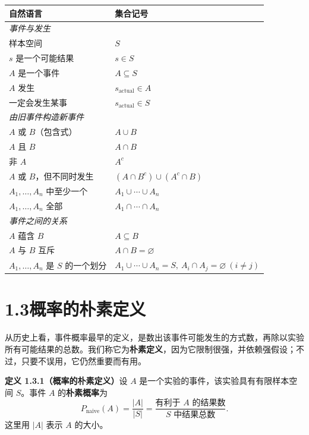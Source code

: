 \documentclass[UTF8, 12pt, fontset=fandol, oneside]{ctexart}
\begin{document}
\begin{center}
\begin{tabular}{ll}
\hline
\textbf{自然语言} & \textbf{集合记号} \\
\hline
\multicolumn{2}{l}{\textit{事件与发生}}\\
样本空间 & $S$\\
$s$ 是一个可能结果 & $s\in S$\\
$A$ 是一个事件 & $A\subseteq S$\\
$A$ 发生 & $s_{\text{actual}}\in A$\\
一定会发生某事 & $s_{\text{actual}}\in S$\\
\hline
\multicolumn{2}{l}{\textit{由旧事件构造新事件}}\\
$A$ 或 $B$（包含式） & $A\cup B$\\
$A$ 且 $B$ & $A\cap B$\\
非 $A$ & $A^c$\\
$A$ 或 $B$，但不同时发生 & $(A\cap B^c)\cup(A^c\cap B)$\\
$A_1,\ldots,A_n$ 中至少一个 & $A_1\cup\cdots\cup A_n$\\
$A_1,\ldots,A_n$ 全部 & $A_1\cap\cdots\cap A_n$\\
\hline
\multicolumn{2}{l}{\textit{事件之间的关系}}\\
$A$ 蕴含 $B$ & $A\subseteq B$\\
$A$ 与 $B$ 互斥 & $A\cap B=\varnothing$\\
$A_1,\ldots,A_n$ 是 $S$ 的一个划分 &
$A_1\cup\cdots\cup A_n=S,\ A_i\cap A_j=\varnothing\ (i\ne j)$\\
\hline
\end{tabular}
\end{center}

\section*{1.3\quad 概率的朴素定义}

从历史上看，事件概率最早的定义，是数出该事件可能发生的方式数，再除以实验所有可能结果的总数。我们称它为\textbf{朴素定义}，因为它限制很强，并依赖强假设；不过，只要不误用，它仍然重要而有用。

\noindent\textbf{定义 1.3.1（概率的朴素定义）}\quad 设 $A$ 是一个实验的事件，该实验具有有限样本空间 $S$。事件 $A$ 的\textbf{朴素概率}为
\[
  P_{\text{naive}}(A)=\frac{|A|}{|S|}
  =\frac{\text{有利于 }A\text{ 的结果数}}{S\text{ 中结果总数}}.
\]
这里用 $|A|$ 表示 $A$ 的大小。
\end{document}

